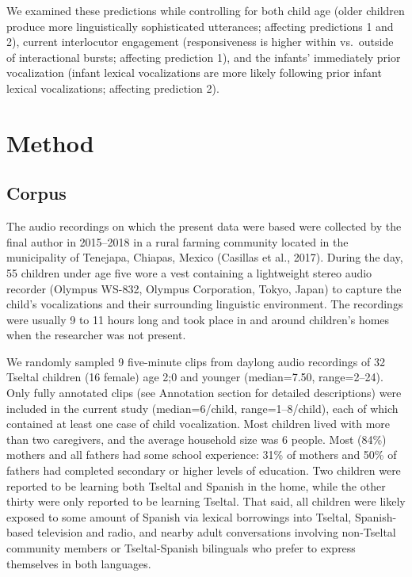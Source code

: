 \documentclass[
  man]{apa6}
\begin{document}
We examined these predictions while controlling for both child age (older children produce more linguistically sophisticated utterances; affecting predictions 1 and 2), current interlocutor engagement (responsiveness is higher within vs.~outside of interactional bursts; affecting prediction 1), and the infants' immediately prior vocalization (infant lexical vocalizations are more likely following prior infant lexical vocalizations; affecting prediction 2).

\hypertarget{method}{%
\section{Method}\label{method}}

\hypertarget{corpus}{%
\subsection{Corpus}\label{corpus}}

The audio recordings on which the present data were based were collected by the final author in 2015--2018 in a rural farming community located in the municipality of Tenejapa, Chiapas, Mexico (Casillas et al., 2017). During the day, 55 children under age five wore a vest containing a lightweight stereo audio recorder (Olympus WS-832, Olympus Corporation, Tokyo, Japan) to capture the child's vocalizations and their surrounding linguistic environment. The recordings were usually 9 to 11 hours long and took place in and around children's homes when the researcher was not present.

We randomly sampled 9 five-minute clips from daylong audio recordings of 32 Tseltal children (16 female) age 2;0 and younger (median=7.50, range=2--24). Only fully annotated clips (see Annotation section for detailed descriptions) were included in the current study (median=6/child, range=1--8/child), each of which contained at least one case of child vocalization. Most children lived with more than two caregivers, and the average household size was 6 people. Most (84\%) mothers and all fathers had some school experience: 31\% of mothers and 50\% of fathers had completed secondary or higher levels of education. Two children were reported to be learning both Tseltal and Spanish in the home, while the other thirty were only reported to be learning Tseltal. That said, all children were likely exposed to some amount of Spanish via lexical borrowings into Tseltal, Spanish-based television and radio, and nearby adult conversations involving non-Tseltal community members or Tseltal-Spanish bilinguals who prefer to express themselves in both languages.
\end{document}
